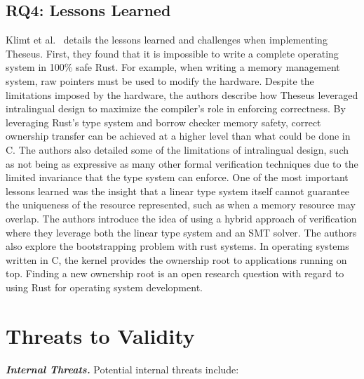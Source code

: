 \documentclass[sigconf]{acmart}
\begin{document}
\subsection{RQ4: Lessons Learned}

Klimt et al.~\cite{Klimt2023-ob} details the lessons learned and challenges when implementing
Theseus. First, they found that it is impossible to write a complete operating system in 100\% safe
Rust. For example, when writing a memory management system, raw pointers must be used to
modify the hardware. Despite the limitations imposed by the hardware, the authors describe how
Theseus leveraged intralingual design to maximize the compiler's role in enforcing correctness. By
leveraging Rust's type system and borrow checker memory safety, correct ownership transfer can be
achieved at a higher level than what could be done in C. The authors also detailed some of the
limitations of intralingual design, such as not being as expressive as many other formal verification
techniques due to the limited invariance that the type system can enforce. One of the most
important lessons learned was the insight that a linear type system itself cannot guarantee
the uniqueness of the resource represented, such as when a memory resource may overlap. The authors
introduce the idea of using a hybrid approach of verification where they leverage both the linear
type system and an SMT solver. The authors also explore the bootstrapping problem with rust
systems. In operating systems written in C, the kernel provides the ownership root to applications running on
top. Finding a new ownership root is an open research question with regard to using Rust for
operating system development.

\section{Threats to Validity}




\textit{\textbf{Internal Threats.}} 
Potential internal threats include:
\end{document}
